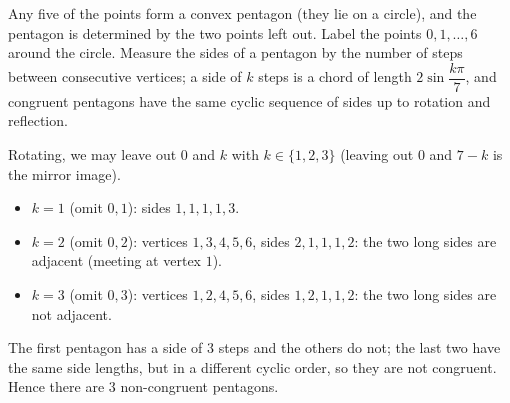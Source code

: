 Any five of the points form a convex pentagon (they lie on a circle), and the pentagon is determined by the two points left out. Label the points $0,1,\dots,6$ around the circle. Measure the sides of a pentagon by the number of steps between consecutive vertices; a side of $k$ steps is a chord of length $2\sin\dfrac{k\pi}{7}$, and congruent pentagons have the same cyclic sequence of sides up to rotation and reflection.

Rotating, we may leave out $0$ and $k$ with $k\in\{1,2,3\}$ (leaving out $0$ and $7-k$ is the mirror image).
\begin{itemize}
\item $k=1$ (omit $0,1$): sides $1,1,1,1,3$.
\item $k=2$ (omit $0,2$): vertices $1,3,4,5,6$, sides $2,1,1,1,2$: the two long sides are adjacent (meeting at vertex $1$).
\item $k=3$ (omit $0,3$): vertices $1,2,4,5,6$, sides $1,2,1,1,2$: the two long sides are not adjacent.
\end{itemize}
The first pentagon has a side of $3$ steps and the others do not; the last two have the same side lengths, but in a different cyclic order, so they are not congruent. Hence there are $\boxed{3}$ non-congruent pentagons.

